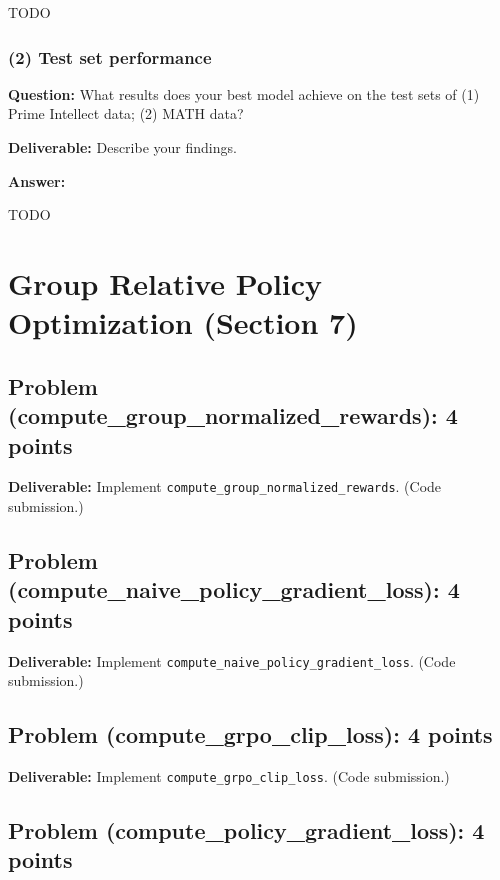\documentclass[11pt]{article}
\begin{document}
TODO

\subsubsection*{(2) Test set performance}

\textbf{Question:} What results does your best model achieve on the test sets of (1) Prime Intellect data; (2) MATH data?

\textbf{Deliverable:} Describe your findings.

\textbf{Answer:}

TODO


\section{Group Relative Policy Optimization (Section 7)}

\subsection*{Problem (compute\_group\_normalized\_rewards): 4 points}

\textbf{Deliverable:} Implement \texttt{compute\_group\_normalized\_rewards}. (Code submission.)

\subsection*{Problem (compute\_naive\_policy\_gradient\_loss): 4 points}

\textbf{Deliverable:} Implement \texttt{compute\_naive\_policy\_gradient\_loss}. (Code submission.)

\subsection*{Problem (compute\_grpo\_clip\_loss): 4 points}

\textbf{Deliverable:} Implement \texttt{compute\_grpo\_clip\_loss}. (Code submission.)

\subsection*{Problem (compute\_policy\_gradient\_loss): 4 points}
\end{document}
